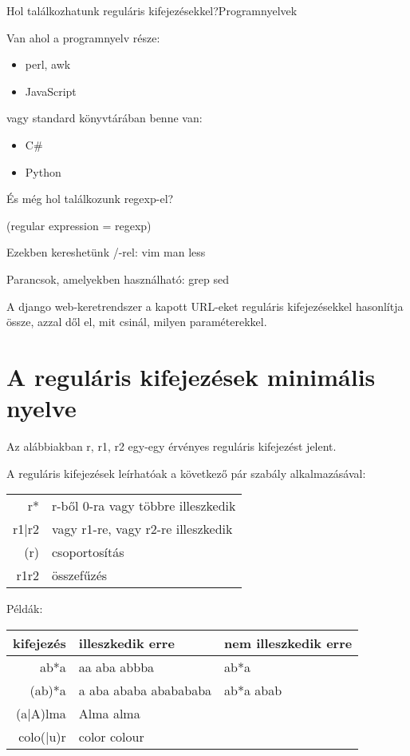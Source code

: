 \documentclass[
    ignorenonframetext
    ]{beamer}
\begin{document}
\begin{frame}[fragile]
    {Hol találkozhatunk reguláris kifejezésekkel?}{Programnyelvek}

    Van ahol a programnyelv része:

    \begin{itemize}
        \item perl, awk
        \item JavaScript
    \end{itemize}

    \vfill
    vagy standard könyvtárában benne van:
    \begin{itemize}
        \item C\#
        \item Python
    \end{itemize}
\end{frame}

\begin{frame}[fragile]
    {És még hol találkozunk regexp-el?}

    (regular expression = regexp)

    \vfill
    Ezekben kereshetünk /-rel: vim man less

    \vfill
    Parancsok, amelyekben használható: grep sed

    \vfill
    A django web-keretrendszer a kapott URL-eket reguláris
    kifejezésekkel hasonlítja össze, azzal dől el, mit csinál, milyen
    paraméterekkel.
\end{frame}

\section{A reguláris kifejezések minimális nyelve}

\begin{frame}
    Az alábbiakban r, r1, r2 egy-egy érvényes reguláris kifejezést jelent.

    A reguláris kifejezések leírhatóak a következő pár szabály
    alkalmazásával:

    \vfill
    \begin{tabular}{rl}
        r* & r-ből 0-ra vagy többre illeszkedik\\
        r1|r2 & vagy r1-re, vagy r2-re illeszkedik\\
        (r) & csoportosítás\\
        r1r2 & összefűzés\\
    \end{tabular}

    \vfill
    Példák:\\
    \begin{tabular}{rll}
        kifejezés & illeszkedik erre & nem illeszkedik erre\\
        \hline
        ab*a & aa aba abbba & ab*a\\
        (ab)*a & a aba ababa ababababa & ab*a abab\\
        (a|A)lma & Alma alma & \\
        colo(|u)r & color colour& \\
    \end{tabular}
\end{frame}
\end{document}
